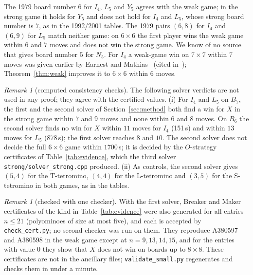 \documentclass[11pt]{article}
\theoremstyle{definition}
\theoremstyle{remark}
\newtheorem{remark}[theorem]{Remark}
\newcommand{\file}[1]{\texttt{#1}}
\begin{document}
The 1979 board number $6$ for $I_4$, $L_5$ and $Y_5$ agrees with the weak game; in the strong game
it holds for $Y_5$ and does not hold for $I_4$ and $L_5$, whose strong board number is $7$, as in the
1992/2001 tables. The 1979 pairs $(6,8)$ for $I_4$ and $(6,9)$ for $L_5$ match neither game: on
$6\times 6$ the first player wins the weak game within $6$ and $7$ moves and does not win the strong
game. We
know of no source that gives board number $5$ for $N_5$. For $I_4$ a weak-game
win on $7\times 7$ within $7$ moves was given earlier by Earnest and Mathias~\cite{EM22} (cited
in~\cite{Wiki}); Theorem~\ref{thm:weak} improves it to $6\times 6$ within $6$ moves.

\begin{remark}[computed consistency checks]\label{rem:computed}
The following solver verdicts are not used in any proof; they agree with the certified values.
(i) For $I_4$ and $L_5$ on $B_7$, the first and the second solver of Section~\ref{sec:method} both
find a win for $X$ in the strong game within $7$ and $9$ moves and none within $6$ and $8$ moves. On
$B_6$ the second solver finds no win for $X$ within $11$ moves for $I_4$ (151\,s) and within $13$
moves for $L_5$ (878\,s); the first solver reaches $8$ and $10$. The second solver does not decide
the full $6\times 6$ game within $1700$\,s; it is decided by the $O$-strategy certificates of Table~\ref{tab:evidence},
which the third solver \file{strong/solver\_strong.cpp} produced.
(ii) As controls, the second solver gives $(5,4)$ for the T-tetromino, $(4,4)$ for the
L-tetromino and $(3,5)$ for the S-tetromino in both games, as in the tables.
\end{remark}

\begin{remark}[checked with one checker]\label{rem:small}
With the first solver, Breaker and Maker certificates of the kind in Table~\ref{tab:evidence} were
also generated for all entries $n\le 21$ (polyominoes of size at most five), and each is accepted
by \file{check\_cert.py}; no second checker was run on them. They reproduce A380597 and A380598 in
the weak game except at $n=9,13,14,15$, and for the entries with value $0$ they show that $X$ does
not win on boards up to $8\times 8$. These certificates are not in the ancillary files;
\file{validate\_small.py} regenerates and checks them in under a minute.
\end{remark}
\end{document}
